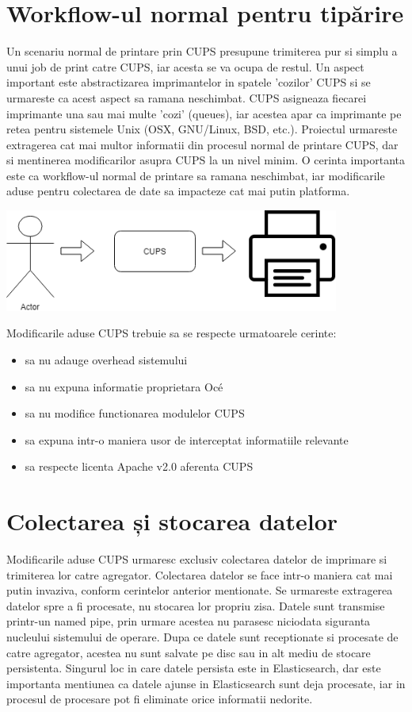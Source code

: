 \documentclass[12pt]{report}
\begin{document}
	\section{Workflow-ul normal pentru tipărire}
Un scenariu normal de printare prin CUPS presupune trimiterea pur si simplu a unui job de print catre CUPS, iar acesta se va ocupa de restul. Un aspect important este abstractizarea imprimantelor in spatele 'cozilor' CUPS si se urmareste ca acest aspect sa ramana neschimbat. CUPS asigneaza fiecarei imprimante una sau mai multe 'cozi' (queues), iar acestea apar ca imprimante pe retea pentru sistemele Unix (OSX, GNU/Linux, BSD, etc.).
Proiectul urmareste extragerea cat mai multor informatii din procesul normal de printare CUPS, dar si mentinerea modificarilor asupra CUPS la un nivel minim. O cerinta importanta este ca workflow-ul normal de printare sa ramana neschimbat, iar modificarile aduse pentru colectarea de date sa impacteze cat mai putin platforma.

\begin{center}
{\includegraphics[width=110mm]{workflow.png}}
\end{center}

Modificarile aduse CUPS trebuie sa se respecte urmatoarele cerinte:
\begin{itemize}
\item sa nu adauge overhead sistemului
\item sa nu expuna informatie proprietara Océ
\item sa nu modifice functionarea modulelor CUPS
\item sa expuna intr-o maniera usor de interceptat informatiile relevante
\item sa respecte licenta Apache v2.0 aferenta CUPS
\end{itemize}

	\section{Colectarea și stocarea datelor}
Modificarile aduse CUPS urmaresc exclusiv colectarea datelor de imprimare si trimiterea lor catre agregator. Colectarea datelor se face intr-o maniera cat mai putin invaziva, conform cerintelor anterior mentionate. Se urmareste extragerea datelor spre a fi procesate, nu stocarea lor propriu zisa. Datele sunt transmise printr-un named pipe, prin urmare acestea nu parasesc niciodata siguranta nucleului sistemului de operare. Dupa ce datele sunt receptionate si procesate de catre agregator, acestea nu sunt salvate pe disc sau in alt mediu de stocare persistenta. Singurul loc in care datele persista este in Elasticsearch, dar este importanta mentiunea ca datele ajunse in Elasticsearch sunt deja procesate, iar in procesul de procesare pot fi eliminate orice informatii nedorite. 
\end{document}
